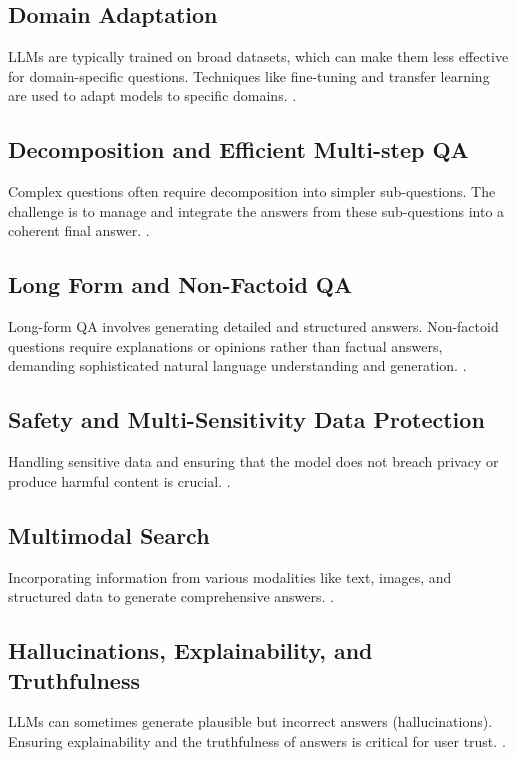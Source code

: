 \documentclass{article}
\begin{document}
\subsection{Domain Adaptation}
LLMs are typically trained on broad datasets, which can make them less effective for domain-specific questions. Techniques like fine-tuning and transfer learning are used to adapt models to specific domains.
\citep{TransferLearningSurvey2019}.

\subsection{Decomposition and Efficient Multi-step QA}
Complex questions often require decomposition into simpler sub-questions. The challenge is to manage and integrate the answers from these sub-questions into a coherent final answer. 
\citep{MultiHopQA2019}.

\subsection{Long Form and Non-Factoid QA}
Long-form QA involves generating detailed and structured answers. Non-factoid questions require explanations or opinions rather than factual answers, demanding sophisticated natural language understanding and generation.
\citep{NarrativeQA2018}.

\subsection{Safety and Multi-Sensitivity Data Protection}
Handling sensitive data and ensuring that the model does not breach privacy or produce harmful content is crucial.
\citep{DataPrivacy2021}.

\subsection{Multimodal Search}
Incorporating information from various modalities like text, images, and structured data to generate comprehensive answers.
\citep{MultimodalAI2020}.

\subsection{Hallucinations, Explainability, and Truthfulness}
LLMs can sometimes generate plausible but incorrect answers (hallucinations). Ensuring explainability and the truthfulness of answers is critical for user trust.
\citep{ExplainableAI2021}.
\end{document}
